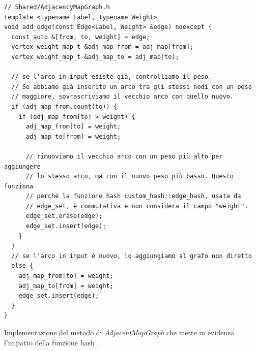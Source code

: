 \begin{listing}[!hb]
\begin{verbatim}
// Shared/AdjacencyMapGraph.h
template <typename Label, typename Weight>
void add_edge(const Edge<Label, Weight> &edge) noexcept {
  const auto &[from, to, weight] = edge;
  vertex_weight_map_t &adj_map_from = adj_map[from];
  vertex_weight_map_t &adj_map_to = adj_map[to];

  // se l'arco in input esiste già, controlliamo il peso.
  // Se abbiamo già inserito un arco tra gli stessi nodi con un peso
  // maggiore, sovrascriviamo il vecchio arco con quello nuovo.
  if (adj_map_from.count(to)) {
    if (adj_map_from[to] > weight) {
      adj_map_from[to] = weight;
      adj_map_to[from] = weight;
        
      // rimuoviamo il vecchio arco con un peso più alto per aggiungere
      // lo stesso arco, ma con il nuovo peso più basso. Questo funziona
      // perché la funzione hash custom_hash::edge_hash, usata da
      // edge_set, è commutativa e non considera il campo "weight".
      edge_set.erase(edge);
      edge_set.insert(edge);
    }
  }
  // se l'arco in input è nuovo, lo aggiungiamo al grafo non diretto
  else {
    adj_map_from[to] = weight;
    adj_map_to[from] = weight;
    edge_set.insert(edge);
  }
}
\end{verbatim}
\caption{Implementazione del metodo  di \textit{AdjacentMapGraph} che mette in evidenza l'impatto della funzione hash .}
\label{listing:add_edge}
\end{listing}


